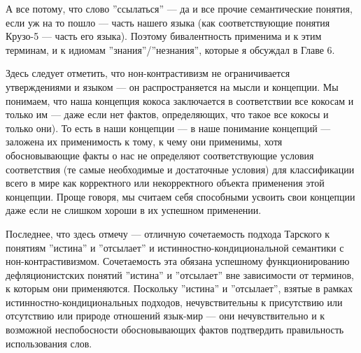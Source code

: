 \documentclass[11pt]{book}
\begin{document}
А все потому, что слово ''ссылаться'' --- да и все прочие семантические понятия, если уж на то пошло --- часть нашего языка (как соответствующие понятия Крузо-5 --- часть его языка). Поэтому бивалентность применима и к этим терминам, и к идиомам ''знания''/''незнания'', которые я обсуждал в Главе 6.

Здесь следует отметить, что нон-контрастивизм не ограничивается утверждениями и языком --- он распространяется на мысли и концепции. Мы понимаем, что наша концепция кокоса заключается в соответствии все кокосам и только им --- даже если нет фактов, определяющих, что такое все кокосы и только они). То есть в наши концепции --- в наше понимание концепций --- заложена их применимость к тому, к чему они применимы, хотя обосновывающие факты о нас не определяют соответствующие условия соответствия (те самые необходимые и достаточные условия) для классификации всего в мире как корректного или некорректного объекта применения этой концепции. Проще говоря, мы считаем себя способными усвоить свои концепции даже если не слишком хороши в их успешном применении.

Последнее, что здесь отмечу --- отличную сочетаемость подхода Тарского к понятиям ''истина'' и ''отсылает'' и истинностно-кондициональной семантики с нон-контрастивизмом. Сочетаемость эта обязана успешному функционированию дефляционистских понятий ''истина'' и ''отсылает'' вне зависимости от терминов, к которым они применяются. Поскольку ''истина'' и ''отсылает'', взятые в рамках истинностно-кондициональных подходов, нечувствительны к присутствию или отсутствию или природе отношений язык-мир --- они нечувствительно и к возможной неспобосности обосновывающих фактов подтвердить правильность использования слов.
\end{document}

